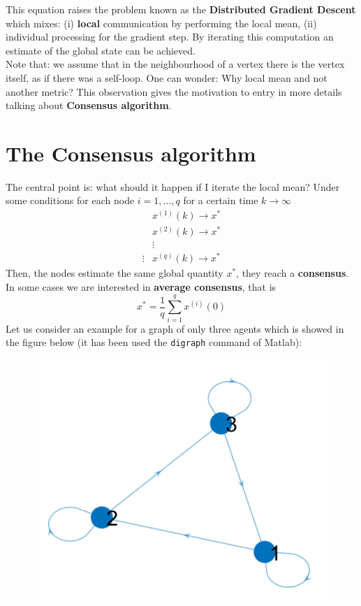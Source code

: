 This equation raises the problem known as the \textbf{Distributed Gradient Descent} which mixes: (i) \textbf{local} communication by performing the local mean, (ii) individual processing for the gradient step. By iterating this computation an estimate of the global state can be achieved. \\
{\color{blue}Note that: we assume that in the neighbourhood of a vertex there is the vertex itself, as if there was a self-loop}.
One can wonder: {\color{red} Why local mean and not another metric?} This observation gives the motivation to entry in more details talking about \textbf{Consensus algorithm}.

\section{The Consensus algorithm}
\noindent
The central point is: what should it happen if I iterate the local mean? Under some conditions for each node $i=1,...,q$
for a certain time $k\rightarrow\infty$
\begin{align*}
    &x^{(1)}(k) \rightarrow x^*\\
    &x^{(2)}(k) \rightarrow x^*\\
    &\vdots\\ \vdots
    &x^{(q)}(k) \rightarrow x^*
\end{align*}
Then, the nodes estimate the same global quantity $x^*$, they reach a \textbf{consensus}. In some cases we are interested in   \textbf{average consensus}, that is
\begin{equation}
    x^*=\frac{1}{q}\sum_{i=1}^q x^{(i)}(0)
\end{equation}
Let us consider an example for a graph of only three agents which is showed in the figure below (it has been used the \texttt{digraph} command of Matlab):
\begin{figure}[h]
    \centering
    \includegraphics[scale=0.7]{images/Es_graph.png}
\end{figure}

